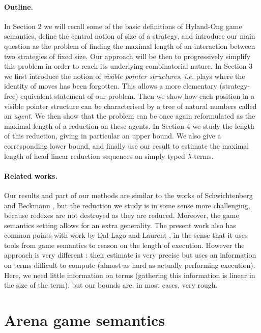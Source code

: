\documentclass{article}
\begin{document}
\paragraph{Outline.} In Section 2 we will recall some of the basic definitions of Hyland-Ong game semantics, define the central notion of size of a strategy, and introduce our main question as the problem of finding 
the maximal length of an interaction between two strategies of fixed size. Our approach will be then to progressively simplify this problem in order to reach its underlying combinatorial nature. In Section 3
we first introduce the notion of \emph{visible pointer structures}, \emph{i.e.} plays where the identity of moves has been forgotten. This allows a more elementary (strategy-free) equivalent statement of our problem.
Then we show how each position in a visible pointer structure can be characterised by a tree of natural numbers called an \emph{agent}. We then show that the problem can be once again reformulated as the maximal length of
a reduction on these agents. In Section 4 we study the length of this reduction, giving in particular an upper bound. We also give a corresponding lower bound, and finally use our result to estimate
the maximal length of head linear reduction sequences on simply typed $\lambda$-terms.

\paragraph{Related works.} Our results and part of our methods are similar to the works of Schwichtenberg and Beckmann \cite{schwichtenberg1982complexity,beckmann2001exact}, but the reduction we study is in some sense more
challenging, because redexes are not
destroyed as they are reduced. Moreover, the game semantics setting allows for an extra generality. The present work also has common points with work by Dal Lago and Laurent \cite{DBLP:conf/csl/LagoL08}, in the sense that it uses
tools from game semantics to reason on the length of execution. However the approach is very different : their estimate is very precise but uses an information on terms difficult to compute (almost as hard as actually performing
execution). Here, we need little information on terms (gathering this information is linear in the size of the term), but our bounds are, in most cases, very rough.

\section{Arena game semantics}
\label{section_games}
\end{document}
